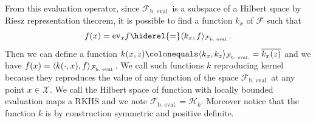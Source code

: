 From this evaluation operator, since $\mathcal{F}_{\text{b.~eval.}}$ is a
subspace of a Hilbert space by Riesz representation theorem, it is possible to
find a function $k_x$ of $\mathcal{F}$ such that
\begin{dmath*}
    f(x) = \text{ev}_x f \hiderel{=} \inner{k_x,
    f}_{\mathcal{F}_{\text{b.~eval.}}}.
\end{dmath*}
Then we can define a function $k(x, z) \colonequals \inner{k_x,
k_z}_{\mathcal{F}_{\text{b.~eval.}}}=\conj{k_x(z)}$ and we have $f(x) =
\langle k(\cdot, x), f\rangle_{\mathcal{F}_{\text{b.~eval.}}}$. We call such functions
$k$ reproducing kernel because they reproduces the value of any function of the
space $\mathcal{F}_{\text{b.~eval.}}$ at any point $x\in\mathcal{X}$. We call
the Hilbert space of function with locally bounded evaluation maps a \acf{RKHS}
and we note $\mathcal{F}_{\text{b.~eval.}} =\mathcal{H}_k$. Moreover notice
that the function $k$ is by construction symmetric and positive definite.
